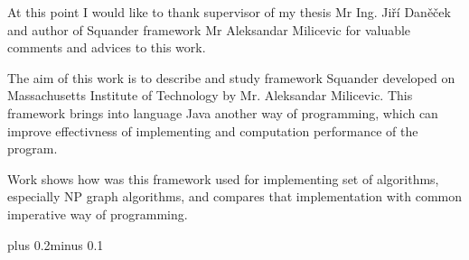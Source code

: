 \documentclass[11pt,twoside,a4paper]{book}
\begin{document}

\coverpagestarts


\acknowledgements
\noindent
At this point I would like to thank supervisor of my thesis Mr Ing. Jiří Daněček
and author of Squander framework Mr Aleksandar Milicevic for valuable comments
and advices to this work.





 
\abstractpage

The aim of this work is to describe and study framework Squander developed on
Massachusetts Institute of Technology by Mr. Aleksandar Milicevic. This
framework brings into language Java another way of programming, which can
improve effectivness of implementing and computation performance of the program.

Work shows how was this framework used for implementing set of algorithms,
especially NP graph algorithms, and compares that implementation with
common imperative way of programming.





\tableofcontents



\listoffigures



\listoftables



\mainbodystarts
\normalfont
{}\baselineskip plus 0.2\baselineskip minus 0.1\baselineskip
\end{document}
